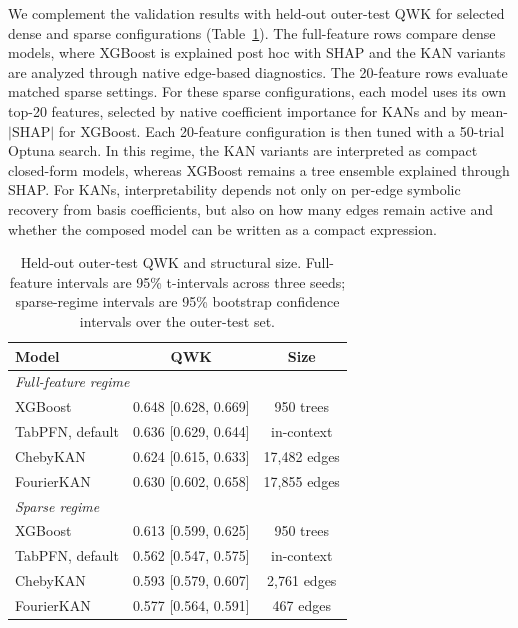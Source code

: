 \documentclass{article}
\begin{document}
We complement the validation results with held-out outer-test QWK for selected dense and sparse configurations (Table~\ref{tab:interpretability_outer_test}). The full-feature rows compare dense models, where XGBoost is explained post hoc with SHAP and the KAN variants are analyzed through native edge-based diagnostics. The 20-feature rows evaluate matched sparse settings. For these sparse configurations, each model uses its own top-20 features, selected by native coefficient importance for KANs and by mean-$|\mathrm{SHAP}|$ for XGBoost. Each 20-feature configuration is then tuned with a 50-trial Optuna search. In this regime, the KAN variants are interpreted as compact closed-form models, whereas XGBoost remains a tree ensemble explained through SHAP. For KANs, interpretability depends not only on per-edge symbolic recovery from basis coefficients, but also on how many edges remain active and whether the composed model can be written as a compact expression.

\begin{table}[t]
  \centering
  \caption{Held-out outer-test QWK and structural size. Full-feature intervals are 95\% t-intervals across three seeds; sparse-regime intervals are 95\% bootstrap confidence intervals over the outer-test set.}
  \label{tab:interpretability_outer_test}
  \footnotesize
  \renewcommand{\arraystretch}{1.08}
  \setlength{\tabcolsep}{3.5pt}
  \begin{tabular}{lcc}
  \hline
  Model & QWK & Size \\
  \hline
  \multicolumn{3}{l}{\emph{Full-feature regime}} \\
  XGBoost & 0.648 [0.628, 0.669] & 950 trees \\
  TabPFN, default & 0.636 [0.629, 0.644] & in-context \\
  ChebyKAN & 0.624 [0.615, 0.633] & 17{,}482 edges \\
  FourierKAN & 0.630 [0.602, 0.658] & 17{,}855 edges \\
  \hline
  \multicolumn{3}{l}{\emph{Sparse regime}} \\
  XGBoost & 0.613 [0.599, 0.625] & 950 trees \\
  TabPFN, default & 0.562 [0.547, 0.575] & in-context \\
  ChebyKAN & 0.593 [0.579, 0.607] & 2{,}761 edges \\
  FourierKAN & 0.577 [0.564, 0.591] & 467 edges \\
  \hline
  \end{tabular}
\end{table}
\end{document}
